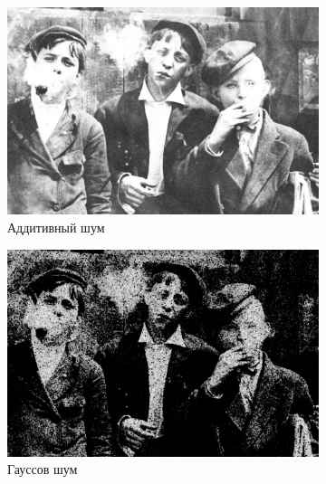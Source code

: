 \begin{figure}[ht]
\begin{subfigure}[b]{0.5\linewidth}
      \includegraphics[width=0.95\linewidth]{../Contraharmonic_Filter/Contraharmonic_Additive_noise_(m,n=(3,_3),q=-0.85).jpg} 
      \caption{Аддитивный шум} 
      \label{contraharmonic_-0.85:c} 
      \vspace{4ex}
    \end{subfigure}%
    \begin{subfigure}[b]{0.5\linewidth}
      \centering
      \includegraphics[width=0.95\linewidth]{../Contraharmonic_Filter/Contraharmonic_Gaussian_noise_(m,n=(3,_3),q=-0.85).jpg} 
      \caption{Гауссов шум} 
      \label{contraharmonic_-0.85:d} 
      \vspace{4ex}
    \end{subfigure}
    \begin{subfigure}[b]{0.5\linewidth}
      \centering

\end{subfigure}
\end{figure}
